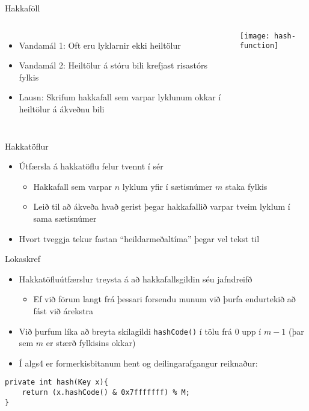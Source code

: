 \documentclass{beamer}
\begin{document}
\begin{frame}{Hakkaföll}
	\begin{columns}
		\begin{itemize}
			\item Vandamál 1: Oft eru lyklarnir ekki heiltölur
			\item Vandamál 2: Heiltölur á stóru bili krefjast risastórs fylkis
			\item Lausn: Skrifum hakkafall  sem varpar lyklunum okkar í heiltölur á ákveðnu bili
		\end{itemize}
		\texttt{[image: hash-function]}
	\end{columns}
\end{frame}

\begin{frame}{Hakkatöflur}
	\begin{itemize}
		\item Útfærsla á hakkatöflu  felur tvennt í sér
		      \begin{itemize}
			      \item Hakkafall  sem varpar $n$ lyklum yfir í sætisnúmer $m$ staka fylkis
			      \item Leið til að ákveða hvað gerist þegar hakkafallið varpar tveim lyklum í sama sætisnúmer 
		      \end{itemize}
		\item Hvort tveggja tekur fastan ``heildarmeðaltíma'' þegar vel tekst til
	\end{itemize}
\end{frame}




\begin{frame}[fragile]{Lokaskref}
	\begin{itemize}
		\item Hakkatöfluútfærslur treysta á að hakkafallsgildin séu jafndreifð
		      \begin{itemize}
			      \item Ef við förum langt frá þessari forsendu munum við þurfa endurtekið að fást við árekstra
		      \end{itemize}
        \item Við þurfum líka að breyta skilagildi \texttt{hashCode()} í tölu frá $0$ upp í $m-1$ (þar sem $m$ er stærð fylkisins okkar)
        \item Í algs4 er formerkisbitanum hent og deilingarafgangur reiknaður:
    \end{itemize}
		      \begin{verbatim}
private int hash(Key x){ 
    return (x.hashCode() & 0x7fffffff) % M; 
}
\end{verbatim}
	
\end{frame}
\end{document}
